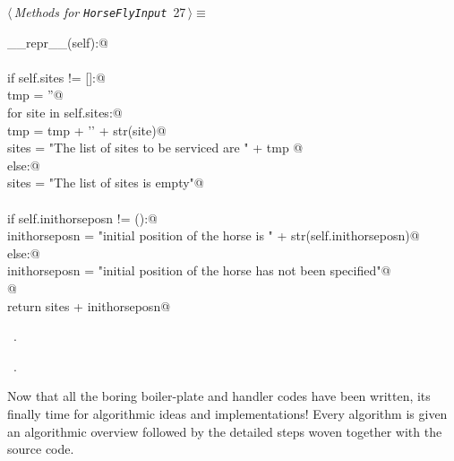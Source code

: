\documentclass[11.5pt]{report}
\begin{document}
\begin{flushleft} \small\label{scrap34}\raggedright\small
{} $\langle\,${\itshape Methods for \verb|HorseFlyInput|}\nobreak\ {\footnotesize {27}}$\,\rangle\equiv$
\vspace{-1ex}
\begin{list}{}{} \item
\mbox{}\verb@def __repr__(self):@\\
\mbox{}\verb@@\\
\mbox{}\verb@  if self.sites != []:@\\
\mbox{}\verb@     tmp = ''@\\
\mbox{}\verb@     for site in self.sites:@\\
\mbox{}\verb@         tmp = tmp + '\n' + str(site)@\\
\mbox{}\verb@     sites = "The list of sites to be serviced are " + tmp    @\\
\mbox{}\verb@  else:@\\
\mbox{}\verb@     sites = "The list of sites is empty"@\\
\mbox{}\verb@@\\
\mbox{}\verb@  if self.inithorseposn != ():@\\
\mbox{}\verb@     inithorseposn = "\nThe initial position of the horse is " + str(self.inithorseposn)@\\
\mbox{}\verb@  else:@\\
\mbox{}\verb@     inithorseposn = "\nThe initial position of the horse has not been specified"@\\
\mbox{}\verb@              @\\
\mbox{}\verb@  return sites + inithorseposn@\\
\mbox{}\verb@@{\NWsep}
\end{list}
\vspace{-1.5ex}
\footnotesize
\begin{list}{}{\setlength{\itemsep}{-\parsep}\setlength{\itemindent}{-\leftmargin}}
\item \NWtxtMacroDefBy\ .
\item \NWtxtMacroRefIn\ .

\item{}
\end{list}
\vspace{4ex}
\end{flushleft}


Now that all the boring boiler-plate and handler codes have been 
written, its finally time for algorithmic ideas and implementations! 
Every algorithm is given an algorithmic overview followed by the 
detailed steps woven together with the source code. 
\end{document}

